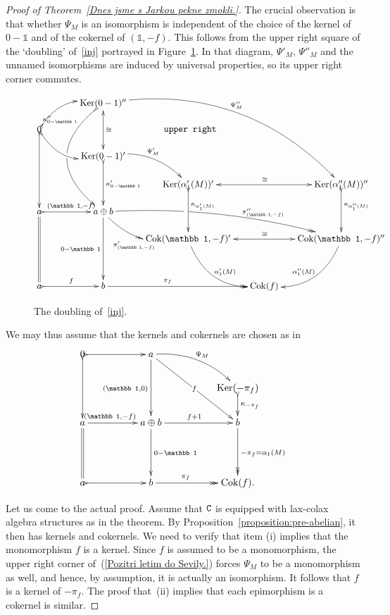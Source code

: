 \documentclass[12pt,leqno]{amsart}
\theoremstyle{definition}
\def\Coker{{\rm Cok}}
\def\Ker{{\rm Ker}}
\def\id{{\mathbb 1}}
\newcommand{\C}{{\tt C}}
\newcommand{\4}{\texttt{4}}
\begin{document}
\begin{proof}[Proof of Theorem~\ref{Dnes jsme s Jarkou pekne zmokli.}]
The crucial observation is that whether $\Psi_M$ is an
isomorphism is independent of the choice of  the kernel of
$0-\id$ and of the cokernel of $(\id,-f)$. This follows from the upper right
square of the `doubling' of~\eqref{inj} portrayed in
Figure~\ref{Greta je na oprave v Dobrisi.}. In that diagram, 
$\Psi'_M$, $\Psi''_M$ and the unnamed
isomorphisms are induced by universal properties, so its upper right
corner commutes.  
\begin{figure}
\[
\xymatrix@C=1.5em@R=1.5em{
&& \Ker(0-1)'' \ar@/^3.8em/[rrrddd]^{\Psi''_M} \ar@{<->}[dd]^\cong 
\ar@{>->}@/_4em/[dddd]_(.2){\kappa''_{0-\id}}|(.48)\hole
\\
0  \ar@{>->}[ddd] \ar@{}[rrrrr]|{\hbox{\tt upper right}}
\ar@{>->}@/^1.5em/[urr]  \ar@{>->}@/_1.5em/[drr] &&&&& 
\\
&&\Ker(0-1)'   \ar@{>->}[dd]^{\kappa'_{0-\id}}  \ar@/^1.5em/[rd]^{\Psi'_M}
\\
&&&  \Ker(\alpha_1'(M))' \ar@{>->}[dd]^(.4){\kappa_{\alpha'_1(M)}}  
\ar @{<->}[rr]^\cong   & & \Ker(\alpha_1''(M))'' 
\ar@{>->}[dd]^(.4){\kappa_{\alpha''_1(M)}}  
\\
a\ar@{>->}[rr]^{(\id,-f)} \ar@{=}[ddd]  && 
a\oplus b \ar@{->>}@/^1.2em/[drrr]^(.65){\pi''_{(\id,-f)}}|(.345)\hole     
\ar@{->>}@/_1.5em/[dr]_{\pi'_{(\id,-f)}}  \ar[ddd]_{0-\id}
\\
&&& \Coker(\id,-f)' \ar@/_2em/[ddr]^{\alpha_1'(M)}  \ar@{<->}[rr]^\cong & & 
\Coker(\id,-f)''  \ar@/^2em/[ddl]_{\alpha_1''(M)}
\\
\\
a\ar@{>->}[rr]^f && b \ar@{->>}[rr]^(.4){\pi_f}  && \Coker(f)
}
\]
\caption{The doubling of~\eqref{inj}.\label{Greta je na oprave v Dobrisi.}}
\end{figure}
We may thus assume that the kernels and cokernels are chosen as in
\begin{equation}
\label{Pozitri letim do Sevily.}
\xymatrix@C=5em@R=2em{
0 \ar@{>->}[r]\ar@{>->}[dd]&
a \ar[dd]_{(\id,0)}\ar[ddr]|f|\hole  \ar@/^1.2em/[dr]^{\Psi_M}
\\
&& \Ker(-\pi_f) \ar@{>->}[d]^{\kappa_{-\pi_f}}
\\
a \ar@{=}[dd]  \ar[r]^(.4){(\id,-f)}    & a\oplus b 
\ar[dd]^{0-\id} \ar[r]^{f+1}   &b \ar@{->>}[dd]^{-\pi_f =\alpha_1(M)}
\\
\\
a \ar@{>->}[r] & b \ar@{->>}[r]^(.4){\pi_f} & \Coker(f).
}
\end{equation}

Let us come to the actual proof. 
Assume that $\C$ is equipped with lax-colax algebra structures as in the
theorem. By Proposition~\ref{proposition:pre-abelian}, it then has
kernels and cokernels. We need to verify that item (i) implies that the
monomorphism  $f$ is a kernel. Since $f$ is assumed to be a
monomorphism, the upper right corner of~(\ref{Pozitri letim do
  Sevily.}) forces $\Psi_M$ to be a monomorphism as well, and hence,
by assumption, it is
actually an isomorphism. It follows that $f$ is a kernel of
$-\pi_f$. The proof that~(ii) implies that each epimorphism is a
cokernel is similar.



\end{proof}
\end{document}
